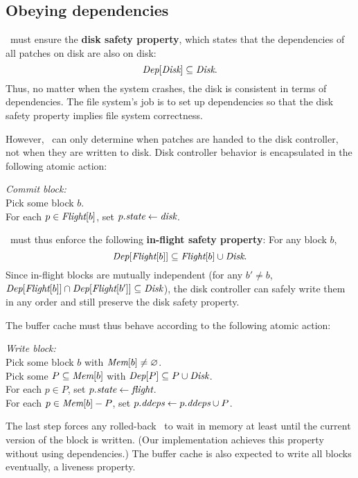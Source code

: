 \subsection{Obeying dependencies}

\Kudos\ must ensure the \textbf{disk safety property}, which states that
 the dependencies of all patches on disk are also on disk:
%
\[ \PDepset{\PDisk} \subseteq \PDisk. \]
%
Thus, no matter when the system crashes, the disk is consistent in terms of
dependencies.
%
The file system's job is to set up dependencies so that the disk safety
property implies file system correctness.

However, \Kudos\ can only determine when patches are handed to the disk
 controller, not when they are written to disk.
%
Disk controller behavior is encapsulated in the following atomic action:

\begin{tabbing}
\textit{Commit block:} \\
\quad Pick some block $b$. \\
\quad For each $p \in \PInf[b]$, set $p.\textit{state} \gets \textit{disk}$.
\end{tabbing}

\noindent
%
\Kudos\ must thus enforce the following \textbf{in-flight
 safety property}: For any block $b$,
%
\[ \PDepset{\PInf[b]} \subseteq \PInf[b] \cup \PDisk . \]
%
Since in-flight blocks are mutually independent (for any $b' \neq b$,
 $\PDepset{\PInf[b]} \cap \PDepset{\PInf[b']} \subseteq \PDisk$), the disk
 controller can safely write them in any order and still preserve the disk
 safety property.


The buffer cache must thus behave according to the following atomic action:

\begin{tabbing}
\textit{Write block:} \\
\quad Pick some block $b$ with $\PMem[b] \neq \emptyset$. \\
\quad Pick some $P \subseteq \PMem[b]$ with $\PDepset{P} \subseteq P \cup
\PDisk$. \\
\quad For each $p \in P$, set $p.\textit{state} \gets \textit{flight}$. \\
\quad For each $p \in \PMem[b]-P$, set $\PDDepset{p} \gets \PDDepset{p}
\cup P$.
\end{tabbing}

\noindent
%
The last step forces any rolled-back \patches\ to wait in memory at least
until the current version of the block is written.  (Our implementation
achieves this property without using dependencies.)
%
The buffer cache is also expected to write all blocks eventually, a
 liveness property.



